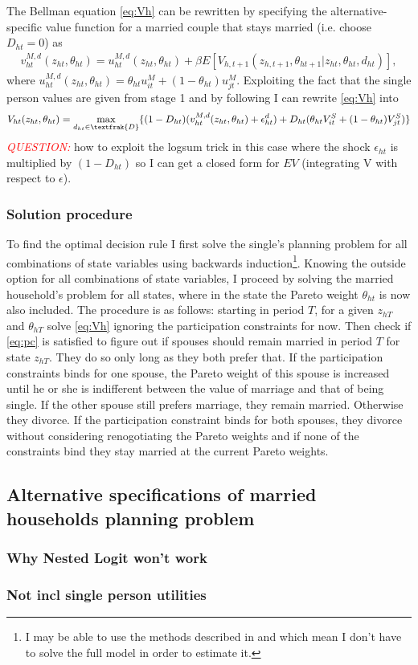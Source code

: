 The Bellman equation \eqref{eq:Vh} can be rewritten by specifying the alternative-specific value function for a married couple that stays married (i.e. choose $D_{ht}=0$) as 
\begin{align*}
v_{ht}^{M,d}(z_{ht},\theta_{ht})=u_{ht}^{M,d}(z_{ht},\theta_{ht})+\beta E[V_{h,t+1}(z_{h,t+1},\theta_{ht+1}|z_{ht},\theta_{ht},d_{ht})],
\end{align*}
where $u_{ht}^{M,d}(z_{ht},\theta_{ht})=\theta_{ht} u_{it}^M+(1-\theta_{ht})u_{jt}^M.$ Exploiting the fact that the single person values are given from stage 1 and by following \cite{Rust1987} I can rewrite \eqref{eq:Vh} into
\begin{align*}
V_{ht}(z_{ht},\theta_{ht})=\max_{d_{ht}\in \textfrak{D}} \{(1-D_{ht})(v_{ht}^{M,d}(z_{ht},\theta_{ht})+\epsilon_{ht}^d)+D_{ht}(\theta_{ht} V_{it}^S+(1-\theta_{ht})V_{jt}^S)\} 
\end{align*}
\textcolor{red}{\textit{QUESTION:}} how to exploit the logsum trick in this case where the shock $\epsilon_{ht}$ is multiplied by $(1-D_{ht})$ so I can get a closed form for $EV$ (integrating V with respect to $\epsilon$).

\subsubsection{Solution procedure}
To find the optimal decision rule I first solve the single's planning problem for all combinations of state variables using backwards induction\footnote{I may be able to use the methods described in \cite{ArcidiaconoMiller2008} and \cite{ArcidiaconoMiller2011} which mean I don't have to solve the full model in order to estimate it.}. Knowing the outside option for all combinations of state variables, I proceed by solving the married household's problem for all states, where in the state the Pareto weight $\theta_{ht}$ is now also included. The procedure is as follows: starting in period $T$, for a given $z_{hT}$ and $\theta_{hT}$ solve \eqref{eq:Vh} ignoring the participation constraints for now. Then check if \eqref{eq:pc} is satisfied to figure out if spouses should remain married in period $T$ for state $z_{hT}$. They do so only long as they both prefer that. If the participation constraints binds for one spouse, the Pareto weight of this spouse is increased until he or she is indifferent between the value of marriage and that of being single. If the other spouse still prefers marriage, they remain married. Otherwise they divorce. If the participation constraint binds for both spouses, they divorce without considering renogotiating the Pareto weights and if none of the constraints bind they stay married at the current Pareto weights.

\subsection{Alternative specifications of married households planning problem }

\subsubsection{Why Nested Logit won't work}

\subsubsection{Not incl single person utilities}



